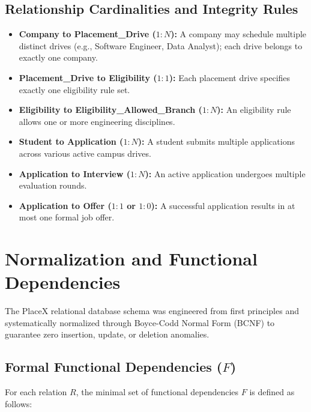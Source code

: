 \documentclass[11pt,a4paper]{article}
\begin{document}
\subsection{Relationship Cardinalities and Integrity Rules}
\begin{itemize}[noitemsep]
    \item \textbf{Company to Placement\_Drive ($1 : N$):} A company may schedule multiple distinct drives (e.g., Software Engineer, Data Analyst); each drive belongs to exactly one company.
    \item \textbf{Placement\_Drive to Eligibility ($1 : 1$):} Each placement drive specifies exactly one eligibility rule set.
    \item \textbf{Eligibility to Eligibility\_Allowed\_Branch ($1 : N$):} An eligibility rule allows one or more engineering disciplines.
    \item \textbf{Student to Application ($1 : N$):} A student submits multiple applications across various active campus drives.
    \item \textbf{Application to Interview ($1 : N$):} An active application undergoes multiple evaluation rounds.
    \item \textbf{Application to Offer ($1 : 1$ or $1 : 0$):} A successful application results in at most one formal job offer.
\end{itemize}

\section{Normalization and Functional Dependencies}
\label{sec:normalization}

The PlaceX relational database schema was engineered from first principles and systematically normalized through Boyce-Codd Normal Form (BCNF) to guarantee zero insertion, update, or deletion anomalies.

\subsection{Formal Functional Dependencies ($F$)}
For each relation $R$, the minimal set of functional dependencies $F$ is defined as follows:
\end{document}
